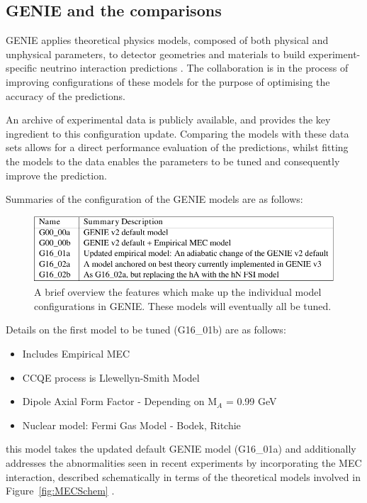 
\subsection{GENIE and the comparisons}
GENIE applies theoretical physics models, composed of both physical and unphysical parameters, to detector geometries and materials to build experiment-specific neutrino interaction predictions \cite{genie}. The collaboration is in the process of improving configurations of these models for the purpose of optimising the accuracy of the predictions.

    An archive of experimental data is publicly available, and provides the key ingredient to this configuration update. Comparing the models with these data sets allows for a direct performance evaluation of the predictions, whilst fitting the models to the data enables the parameters to be tuned and consequently improve the prediction.

Summaries of the configuration of the GENIE models are as follows:

\begin{figure}[h!]
    \centering
    \includegraphics[width=\textwidth]{images/model_summaries.pdf}
    \caption{A brief overview the features which make up the individual model configurations in GENIE. These models will eventually all be tuned.}
    \label{tab:modelConfigs}
\end{figure}


Details on the first model to be tuned (G16\_01b) are as follows: 

\begin{itemize}
    \item Includes Empirical MEC
    \item CCQE process is Llewellyn-Smith Model
    \item Dipole Axial Form Factor - Depending on M\(_{A}\) = 0.99 GeV
    \item Nuclear model: Fermi Gas Model - Bodek, Ritchie
\end{itemize}

this model takes the updated default GENIE model (G16\_01a) and additionally addresses the abnormalities seen in recent experiments by incorporating the MEC interaction, described schematically in terms of the theoretical models involved in Figure~\ref{fig:MECSchem} \cite{MEC}. 

